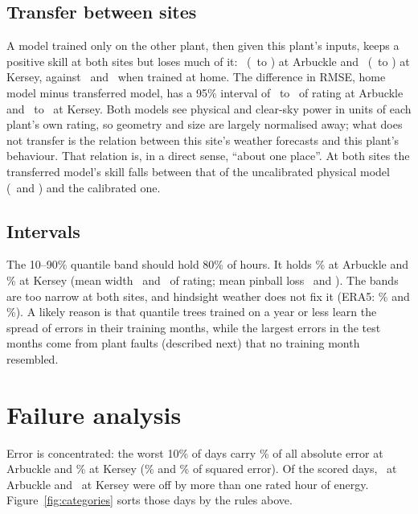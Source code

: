 \documentclass[11pt]{article}
\begin{document}
\subsection{Transfer between sites}

A model trained only on the other plant, then given this plant's inputs, keeps a positive skill at both sites but loses much of it: \ArbTransferSkill\ (\ArbTransferLo\ to \ArbTransferHi) at Arbuckle and \KerTransferSkill\ (\KerTransferLo\ to \KerTransferHi) at Kersey, against \ArbGbmSkill\ and \KerGbmSkill\ when trained at home. The difference in RMSE, home model minus transferred model, has a 95\% interval of \ArbTransferGapLo\ to \ArbTransferGapHi\ of rating at Arbuckle and \KerTransferGapLo\ to \KerTransferGapHi\ at Kersey. Both models see physical and clear-sky power in units of each plant's own rating, so geometry and size are largely normalised away; what does not transfer is the relation between this site's weather forecasts and this plant's behaviour. That relation is, in a direct sense, ``about one place''. At both sites the transferred model's skill falls between that of the uncalibrated physical model (\ArbPhysSkill\ and \KerPhysSkill) and the calibrated one.

\subsection{Intervals}

The 10--90\% quantile band should hold 80\% of hours. It holds \ArbCovGfs\% at Arbuckle and \KerCovGfs\% at Kersey (mean width \ArbWidthGfs\ and \KerWidthGfs\ of rating; mean pinball loss \ArbPinballGfs\ and \KerPinballGfs). The bands are too narrow at both sites, and hindsight weather does not fix it (ERA5: \ArbCovEra\% and \KerCovEra\%). A likely reason is that quantile trees trained on a year or less learn the spread of errors in their training months, while the largest errors in the test months come from plant faults (described next) that no training month resembled.

\section{Failure analysis}\label{sec:failures}

Error is concentrated: the worst 10\% of days carry \ArbWorstTenAbs\% of all absolute error at Arbuckle and \KerWorstTenAbs\% at Kersey (\ArbWorstTenSq\% and \KerWorstTenSq\% of squared error). Of the scored days, \ArbDaysOverOne\ at Arbuckle and \KerDaysOverOne\ at Kersey were off by more than one rated hour of energy. Figure~\ref{fig:categories} sorts those days by the rules above.
\end{document}
